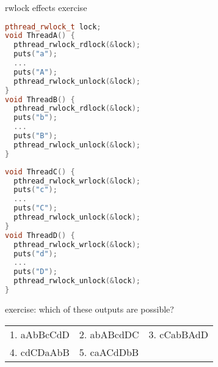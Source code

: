 \begin{frame}[fragile,label=rwlockEffectsExer]{rwlock effects exercise}
\begin{minipage}{0.45\textwidth}
\begin{lstlisting}[language=C++,style=smaller]
pthread_rwlock_t lock;
void ThreadA() {
  pthread_rwlock_rdlock(&lock);
  puts("a");
  ...
  puts("A");
  pthread_rwlock_unlock(&lock);
}
void ThreadB() {
  pthread_rwlock_rdlock(&lock);
  puts("b");
  ...
  puts("B");
  pthread_rwlock_unlock(&lock);
}
\end{lstlisting}
\end{minipage}
\begin{minipage}{0.45\textwidth}
\begin{lstlisting}[language=C++,style=smaller]
void ThreadC() {
  pthread_rwlock_wrlock(&lock);
  puts("c");
  ...
  puts("C");
  pthread_rwlock_unlock(&lock);
}
void ThreadD() {
  pthread_rwlock_wrlock(&lock);
  puts("d");
  ...
  puts("D");
  pthread_rwlock_unlock(&lock);
}
\end{lstlisting}
\end{minipage}
exercise: which of these outputs are possible? \\
\begin{tabular}{lll}
1. aAbBcCdD & 2. abABcdDC & 3. cCabBAdD \\ 4. cdCDaAbB & 5. caACdDbB \\
\end{tabular}
\end{frame}
